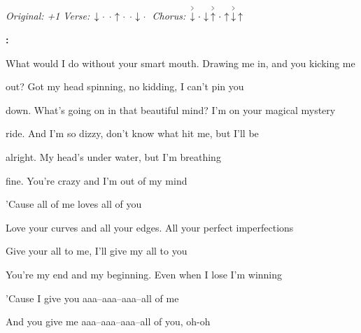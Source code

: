 \begin{song}


\begin{headerbox}
\RaiseBoxWithAccents
\textit{Original: +1} \quad
\textit{Verse:} $\Down\Miss\Miss\Up\Miss\Miss\Down\Miss$ \quad
\textit{Chorus:} $\AccentDown\Miss\Down\AccentUp\Miss\Up\AccentDown\Up$
\end{headerbox}

\begin{hchordbox}
\end{hchordbox}

\large

\bigskip

\Intro\textbf{:}      \par

\bigskip

 What would I do without your smart mouth. Drawing me in, and you kicking me \par
{}out? Got my head spinning, no kidding, I can't pin you \par
{}down. What's going on in that beautiful mind? I'm on your magical mystery \par
{}ride. And I'm so dizzy, don't know what hit me, but I'll be \par

\bigskip

alright. My head's under water, but I'm breathing \par
{}fine. You're crazy and I'm out of my mind \par

\bigskip

'Cause all of me loves all of you \par
Love your curves and all your edges. All your perfect imperfections \par
Give your all to me, I'll give my all to you \par
You're my end and my beginning. Even when I lose I'm winning \par
'Cause I give you aaa–aaa–aaa–all of me   \par
And you give me aaa–aaa–aaa–all of you, oh-oh \par


\end{song}
